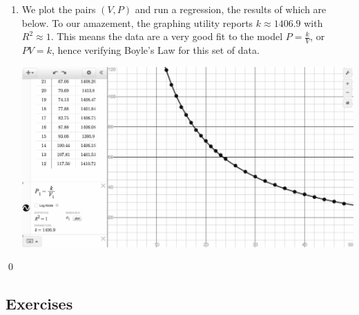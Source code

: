 \begin{ex}
\begin{enumerate}
\item  We plot the pairs $(V, P)$ and run a regression, the results of which are below.  To our amazement, the graphing utility reports $k \approx 1406.9$ with  $R^2 \approx 1$.  This means the data are a very good fit to the model $P = \frac{k}{V}$, or $PV = k$, hence verifying Boyle's Law for this set of data.

\begin{center}

\includegraphics[width=6in]{./RationalIneqGraphics/BoylesLawEx.jpg} 

\end{center}


\end{enumerate}
\qed

\end{ex}

\newpage

\subsection{Exercises}



\closegraphsfile
